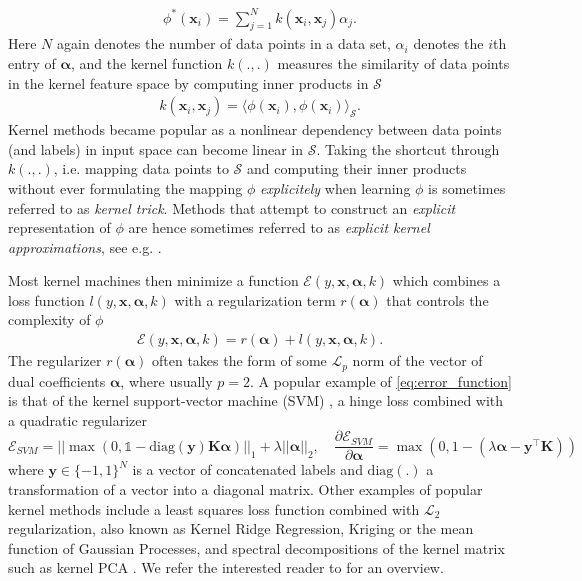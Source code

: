 \documentclass{article} %
\newcommand{\ones}{\ensuremath{\mathds{1}}}
\newcommand{\va}{\boldsymbol{\alpha}}
\newcommand{\Bx}{\mathbf{x}}
\renewcommand{\vec}[1]{\mathbf{#1}}
\begin{document}
\begin{align}\label{eq:kernel_trick}
\phi^*(\Bx_i)=\sum_{j=1}^N k(\Bx_i,\Bx_j)\alpha_j.
\end{align}
Here $N$ again denotes the number of data points in a data set, $\alpha_i$ denotes the $i$th entry of $\va$, and the kernel function $k(.,.)$ measures the similarity of data points in the kernel feature space by computing inner products in $\mathcal{S}$
\begin{align}\label{eq:kernel_function}
k(\Bx_i,\Bx_j)=\langle \phi(\Bx_i), \phi(\Bx_i)\rangle_{\mathcal{S}}.
\end{align}
%
Kernel methods became popular as a nonlinear dependency between data points (and labels) in input space can become linear in $\mathcal{S}$.
Taking the shortcut through $k(.,.)$, i.e. mapping data points to $\mathcal{S}$ and computing their inner products without ever formulating the mapping $\phi$ {\em explicitely} when learning $\phi$ is sometimes referred to as {\em kernel trick}. Methods that attempt to construct an {\em explicit} representation of $\phi$ are hence sometimes referred to as {\em explicit kernel approximations}, see e.g. \cite{Dai2014}. 

Most kernel machines then minimize a function $\mathcal{E}(y, \Bx, \va, k)$ which combines a loss function $l(y, \Bx, \va, k)$ with a regularization term $r(\va)$ that controls the complexity of $\phi$ 
%
\begin{align}\label{eq:error_function}
\mathcal{E}(y, \Bx, \va, k) = r(\va) + l(y, \Bx, \va, k).
\end{align}
%
The regularizer $r(\va)$ often takes the form of some $\mathcal{L}_p$ norm of the vector of dual coefficients $\va$, where usually $p=2$. A popular example of \autoref{eq:error_function} is that of the kernel support-vector machine (SVM) \cite{Cortes1995}, a hinge loss combined with a quadratic regularizer
%
\begin{equation}\label{eq:svm_gradient}
\mathcal{E}_{SVM} = ||\max \left(0,\ones-\text{diag}(\vec{y}) \vec{K} \va \right)||_1 + \lambda ||\va||_2, \quad \frac{\partial\mathcal{E}_{SVM}}{\partial \va} =\max \left(0,1-\left(\lambda\va - \vec{y}^{\top}\vec{K}\right)\right)
\end{equation}
%
where $\vec{y}\in\{-1,1\}^N$ is a vector of concatenated labels and $\text{diag}(.)$ a transformation of a vector into a diagonal matrix. 
Other examples of popular kernel methods include a least squares loss function combined with $\mathcal{L}_2$ regularization, also known as Kernel Ridge Regression, Kriging \cite{kriging} or the mean function of Gaussian Processes, and spectral decompositions of the kernel matrix such as kernel PCA \cite{Scholkopf:1998p427}. We refer the interested reader to \cite{shawe2004kernel} for an overview. 
\end{document}
